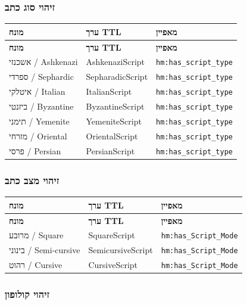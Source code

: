 \documentclass[12pt,a4paper]{article}
\newcommand{\ttlprop}[1]{\texttt{#1}}
\begin{document}
\subsubsection{זיהוי סוג כתב}

\begin{longtable}{|p{4cm}|L{5cm}|L{7cm}|}
\hline
\textbf{מונח} & \textbf{ערך TTL} & \textbf{מאפיין} \\
\hline
\endfirsthead
\hline
\textbf{מונח} & \textbf{ערך TTL} & \textbf{מאפיין} \\
\hline
\endhead
\hline
\endfoot
אשכנזי / Ashkenazi & AshkenaziScript & \ttlprop{hm:has\_script\_type} \\
\hline
ספרדי / Sephardic & SepharadicScript & \ttlprop{hm:has\_script\_type} \\
\hline
איטלקי / Italian & ItalianScript & \ttlprop{hm:has\_script\_type} \\
\hline
ביזנטי / Byzantine & ByzantineScript & \ttlprop{hm:has\_script\_type} \\
\hline
תימני / Yemenite & YemeniteScript & \ttlprop{hm:has\_script\_type} \\
\hline
מזרחי / Oriental & OrientalScript & \ttlprop{hm:has\_script\_type} \\
\hline
פרסי / Persian & PersianScript & \ttlprop{hm:has\_script\_type} \\
\hline
\end{longtable}

\subsubsection{זיהוי מצב כתב}

\begin{longtable}{|p{4cm}|L{5cm}|L{7cm}|}
\hline
\textbf{מונח} & \textbf{ערך TTL} & \textbf{מאפיין} \\
\hline
\endfirsthead
\hline
\textbf{מונח} & \textbf{ערך TTL} & \textbf{מאפיין} \\
\hline
\endhead
\hline
\endfoot
מרובע / Square & SquareScript & \ttlprop{hm:has\_Script\_Mode} \\
\hline
בינוני / Semi-cursive & SemicursiveScript & \ttlprop{hm:has\_Script\_Mode} \\
\hline
רהוט / Cursive & CursiveScript & \ttlprop{hm:has\_Script\_Mode} \\
\hline
\end{longtable}

\subsubsection{זיהוי קולופון}
\end{document}
